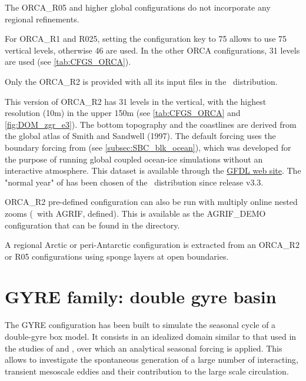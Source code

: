 \documentclass[../main/NEMO_manual]{subfiles}
\begin{document}
The ORCA\_R05 and higher global configurations do not incorporate any regional refinements.

For ORCA\_R1 and R025, setting the configuration key to 75 allows to use 75 vertical levels, otherwise 46 are used.
In the other ORCA configurations, 31 levels are used
(see \autoref{tab:CFGS_ORCA}). %

Only the ORCA\_R2 is provided with all its input files in the \NEMO\ distribution.

This version of ORCA\_R2 has 31 levels in the vertical, with the highest resolution (10m) in the upper 150m
(see \autoref{tab:CFGS_ORCA} and \autoref{fig:DOM_zgr_e3}).
The bottom topography and the coastlines are derived from the global atlas of Smith and Sandwell (1997).
The default forcing uses the boundary forcing from \citet{large.yeager_rpt04} (see \autoref{subsec:SBC_blk_ocean}),
which was developed for the purpose of running global coupled ocean-ice simulations without
an interactive atmosphere.
This \citet{large.yeager_rpt04} dataset is available through
the \href{http://nomads.gfdl.noaa.gov/nomads/forms/mom4/CORE.html}{GFDL web site}.
The "normal year" of \citet{large.yeager_rpt04} has been chosen of the \NEMO\ distribution since release v3.3.

ORCA\_R2 pre-defined configuration can also be run with multiply online nested zooms (\ie\ with AGRIF,  defined).
This is available as the AGRIF\_DEMO configuration that can be found in the  directory.

A regional Arctic or peri-Antarctic configuration is extracted from an ORCA\_R2 or R05 configurations using
sponge layers at open boundaries.

\section{GYRE family: double gyre basin}
\label{sec:CFGS_gyre}

The GYRE configuration \citep{levy.klein.ea_OM10} has been built to
simulate the seasonal cycle of a double-gyre box model.
It consists in an idealized domain similar to that used in the studies of \citet{drijfhout_JPO94} and
\citet{hazeleger.drijfhout_JPO98, hazeleger.drijfhout_JPO99, hazeleger.drijfhout_JGR00, hazeleger.drijfhout_JPO00},
over which an analytical seasonal forcing is applied.
This allows to investigate the spontaneous generation of a large number of interacting, transient mesoscale eddies
and their contribution to the large scale circulation.
\end{document}
